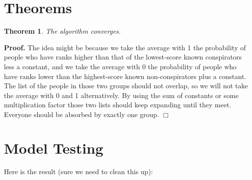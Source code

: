 \documentclass{icmmcm}
\newtheorem{Theo1}{Theorem}
\begin{document}
\section{Theorems}
\begin{Theo1}
The algorithm converges.
\end{Theo1}
{\bf Proof.}
The idea might be because we take the average with 1 the 
probability of people who have
ranks higher than that of the lowest-score known conspirators less a constant, and we
take the average with 0 the 
probability of people who have ranks lower than the highest-score known non-conspirators plus a constant.
The list of the people in those two groups should not overlap,
so we will not take the average with 0 and 1 alternatively.
By using the sum of constants or some multiplication factor
those two lists should keep expanding until they meet.
Everyone should be absorbed by exactly one group. 
\hfill $\Box$

\section{Model Testing}

Here is the result (sure we need to clean this up):
\end{document}
